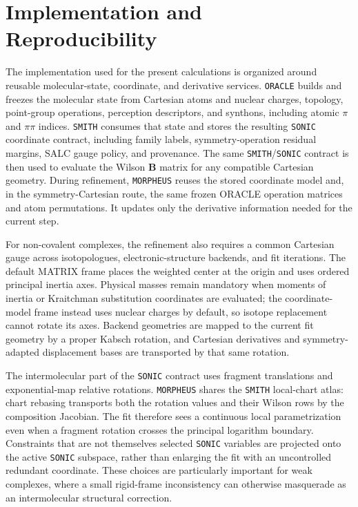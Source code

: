 \documentclass[aip,jcp,reprint,longbibliography,floatfix]{revtex4-2}
\begin{document}
\section{Implementation and Reproducibility}

The implementation used for the present calculations is organized around
reusable molecular-state, coordinate, and derivative services. \texttt{ORACLE}
builds and freezes the molecular state from Cartesian atoms and nuclear
charges, topology, point-group operations, perception descriptors, and
synthons, including atomic $\pi$ and $\pi\pi$ indices.  \texttt{SMITH}
consumes that state and stores the resulting
\texttt{SONIC} coordinate contract,
including family labels, symmetry-operation residual margins, SALC gauge
policy, and provenance. The same \texttt{SMITH}/\texttt{SONIC} contract is
then used to evaluate the Wilson $\mathbf{B}$ matrix for any compatible
Cartesian geometry. During refinement, \texttt{MORPHEUS} reuses the stored
coordinate model and, in the symmetry-Cartesian route, the same frozen ORACLE
operation matrices and atom permutations.  It updates only the derivative
information needed for the current step.

For non-covalent complexes, the refinement also requires a common Cartesian
gauge across isotopologues, electronic-structure backends, and fit iterations.
The default MATRIX frame places the weighted center at the origin and uses
ordered principal inertia axes.  Physical masses remain mandatory when moments
of inertia or Kraitchman substitution coordinates are evaluated; the
coordinate-model frame instead uses nuclear charges by default, so isotope
replacement cannot rotate its axes.  Backend geometries are mapped to the
current fit geometry by a proper Kabsch rotation, and Cartesian derivatives and
symmetry-adapted displacement bases are transported by that same rotation.

The intermolecular part of the \texttt{SONIC} contract uses fragment
translations and exponential-map relative rotations.  \texttt{MORPHEUS}
shares the \texttt{SMITH} local-chart atlas: chart rebasing transports both the
rotation values and their Wilson rows by the composition Jacobian.  The fit
therefore sees a continuous local parametrization even when a fragment
rotation crosses the principal logarithm boundary.  Constraints that are not
themselves selected \texttt{SONIC} variables are projected onto the active
\texttt{SONIC} subspace, rather than enlarging the fit with an uncontrolled
redundant coordinate.  These choices are particularly important for weak
complexes, where a small rigid-frame inconsistency can otherwise masquerade as
an intermolecular structural correction.
\end{document}
